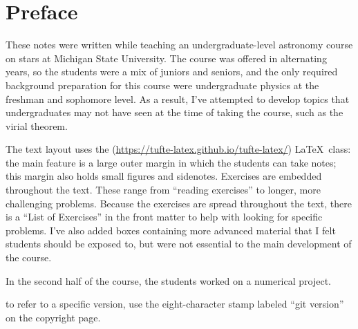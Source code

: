 
\section*{Preface}
These notes were written while teaching an undergraduate-level astronomy course on stars at Michigan State University. The course was offered in alternating years, so the students were a mix of juniors and seniors, and the only required background preparation for this course were undergraduate physics at the freshman and sophomore level. As a result, I've attempted to develop topics that undergraduates may not have seen at the time of taking the course, such as the virial theorem.

The text layout uses the  (\url{https://tufte-latex.github.io/tufte-latex/}) \LaTeX\ class:  the main feature is a large outer margin in which the students can take notes; this margin also holds small figures and sidenotes. Exercises are embedded throughout the text.  These range from ``reading exercises'' to longer, more challenging problems.  Because the exercises are spread throughout the text, there is a ``List of Exercises'' in the front matter to help with looking for specific problems. I've also added boxes containing more advanced material that I felt students should be exposed to, but were not essential to the main development of the course.

In the second half of the course, the students worked on a numerical project.

 to refer to a specific version, use the eight-character stamp labeled ``git version'' on the copyright page.
